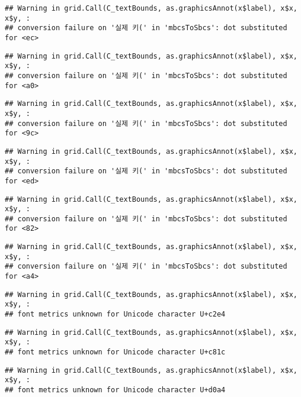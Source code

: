 \documentclass[]{book}
\begin{document}
\begin{verbatim}
## Warning in grid.Call(C_textBounds, as.graphicsAnnot(x$label), x$x, x$y, :
## conversion failure on '실제 키(' in 'mbcsToSbcs': dot substituted for <ec>
\end{verbatim}

\begin{verbatim}
## Warning in grid.Call(C_textBounds, as.graphicsAnnot(x$label), x$x, x$y, :
## conversion failure on '실제 키(' in 'mbcsToSbcs': dot substituted for <a0>
\end{verbatim}

\begin{verbatim}
## Warning in grid.Call(C_textBounds, as.graphicsAnnot(x$label), x$x, x$y, :
## conversion failure on '실제 키(' in 'mbcsToSbcs': dot substituted for <9c>
\end{verbatim}

\begin{verbatim}
## Warning in grid.Call(C_textBounds, as.graphicsAnnot(x$label), x$x, x$y, :
## conversion failure on '실제 키(' in 'mbcsToSbcs': dot substituted for <ed>
\end{verbatim}

\begin{verbatim}
## Warning in grid.Call(C_textBounds, as.graphicsAnnot(x$label), x$x, x$y, :
## conversion failure on '실제 키(' in 'mbcsToSbcs': dot substituted for <82>
\end{verbatim}

\begin{verbatim}
## Warning in grid.Call(C_textBounds, as.graphicsAnnot(x$label), x$x, x$y, :
## conversion failure on '실제 키(' in 'mbcsToSbcs': dot substituted for <a4>
\end{verbatim}

\begin{verbatim}
## Warning in grid.Call(C_textBounds, as.graphicsAnnot(x$label), x$x, x$y, :
## font metrics unknown for Unicode character U+c2e4
\end{verbatim}

\begin{verbatim}
## Warning in grid.Call(C_textBounds, as.graphicsAnnot(x$label), x$x, x$y, :
## font metrics unknown for Unicode character U+c81c
\end{verbatim}

\begin{verbatim}
## Warning in grid.Call(C_textBounds, as.graphicsAnnot(x$label), x$x, x$y, :
## font metrics unknown for Unicode character U+d0a4
\end{verbatim}
\end{document}

